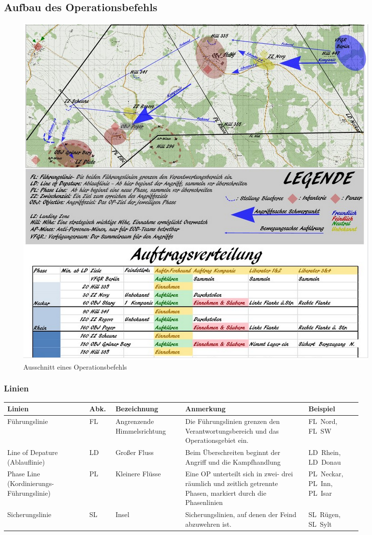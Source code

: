 \pagebreak
\subsection{Aufbau des Operationsbefehls}
\label{OPbef}

\begin{figure}[h]
	\centering
	\includegraphics[width=\textwidth]{./img/fortgeschrittenes/karteUndMarkierungen/OP-Befehl}
	\caption[Ausschnitt eines Operationsbefehls]{Ausschnitt eines Operationsbefehls\footnotemark}
	\label{fig:OP-Befehl}
\end{figure}

\subsubsection{Linien}
\begin{longtable}{P{0.2\linewidth}P{0.05\linewidth}P{0.17\linewidth}P{0.3\linewidth}P{0.13\linewidth}} 	
	\toprule
	Linien & Abk. & Bezeichnung & Anmerkung & Beispiel\\ 
	\midrule
	Führungslinie & FL & Angrenzende Himmelsrichtung & Die Führungslinien grenzen  den Verantwortungsbereich und das Operationsgebiet ein. & FL~Nord, FL~SW \\ 
	Line of Depature (Ablauflinie) & LD & Großer Fluss & Beim Überschreiten beginnt der Angriff und die Kampfhandlung & LD~Rhein, LD~Donau\\ 
	Phase Line (Kordinierungs-Führungslinie) & PL & Kleinere Flüsse & Eine OP unterteilt sich in zwei- drei räumlich und zeitlich getrennte Phasen, markiert durch die Phasenlinien & PL~Neckar, PL~Inn, PL~Isar\\ 
	Sicherungslinie & SL & Insel & Sicherungslinien, auf denen der Feind abzuwehren ist. & SL~Rügen, SL~Sylt\\ 
	\bottomrule
\end{longtable}

